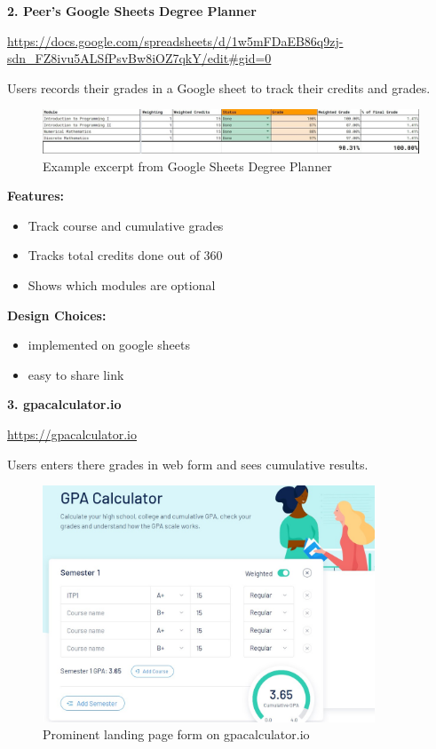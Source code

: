 \documentclass{article}
\begin{document}
\noindent \textbf{2. Peer's Google Sheets Degree Planner}

\noindent \sloppy \url{https://docs.google.com/spreadsheets/d/1w5mFDaEB86q9zj-sdn_FZ8ivu5ALSfPsvBw8iOZ7qkY/edit#gid=0}
\bigskip

\noindent Users records their grades in a Google sheet to track their credits and grades.
\bigskip

\begin{figure}[h]
\noindent \includegraphics[width=\textwidth]{degree-planner-partial}
\centering
\caption{Example excerpt from Google Sheets Degree Planner}
\label{fig: deg-planner}
\end{figure}

\noindent \textbf{Features:}
\begin{itemize}
\item Track course and cumulative grades
\item Tracks total credits done out of 360
\item Shows which modules are optional
\end{itemize}
\medskip

\noindent \textbf{Design Choices:}
\begin{itemize}
\item implemented on google sheets
\item easy to share link
\end{itemize}
\medskip

\noindent \textbf{3. gpacalculator.io}

\noindent \url{https://gpacalculator.io}
\bigskip

\noindent Users enters there grades in web form and sees cumulative results.
\bigskip

\begin{figure}[h]
\noindent \includegraphics[height=200pt]{gpa-calculator-io}
\centering
\caption{Prominent landing page form on gpacalculator.io}
\label{fig: gpa-calc}
\end{figure}
\medskip
\end{document}
